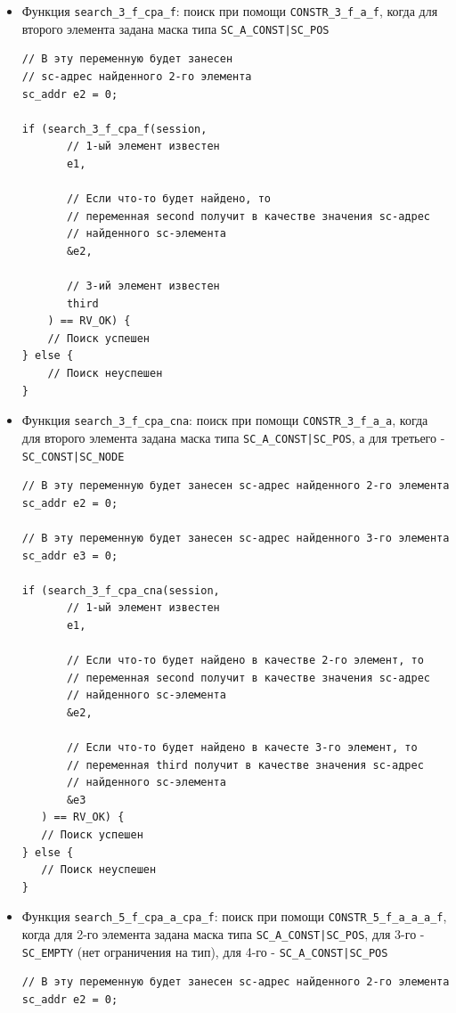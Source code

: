 \begin{itemize}
\item Функция \lstinline|search_3_f_cpa_f|: поиск при помощи
  \lstinline|CONSTR_3_f_a_f|, когда для второго элемента задана маска
  типа \lstinline+SC_A_CONST|SC_POS+
\begin{lstlisting}[texcl]
// В эту переменную будет занесен
// sc-адрес найденного 2-го элемента
sc_addr e2 = 0;

if (search_3_f_cpa_f(session,
       // 1-ый элемент известен
       e1,

       // Если что-то будет найдено, то
       // переменная second получит в качестве значения sc-адрес
       // найденного sc-элемента
       &e2,

       // 3-ий элемент известен
       third
    ) == RV_OK) {
    // Поиск успешен
} else {
    // Поиск неуспешен
}
\end{lstlisting}

\item Функция \lstinline|search_3_f_cpa_cna|: поиск при помощи
  \lstinline|CONSTR_3_f_a_a|, когда для второго элемента задана маска
  типа \lstinline+SC_A_CONST|SC_POS+, а для третьего -
  \lstinline+SC_CONST|SC_NODE+
\begin{lstlisting}[texcl]
// В эту переменную будет занесен sc-адрес найденного 2-го элемента
sc_addr e2 = 0;

// В эту переменную будет занесен sc-адрес найденного 3-го элемента
sc_addr e3 = 0;

if (search_3_f_cpa_cna(session,
       // 1-ый элемент известен
       e1,

       // Если что-то будет найдено в качестве 2-го элемент, то
       // переменная second получит в качестве значения sc-адрес
       // найденного sc-элемента
       &e2,

       // Если что-то будет найдено в качесте 3-го элемент, то
       // переменная third получит в качестве значения sc-адрес
       // найденного sc-элемента
       &e3
   ) == RV_OK) {
   // Поиск успешен
} else {
   // Поиск неуспешен
}
\end{lstlisting}

\item Функция \lstinline|search_5_f_cpa_a_cpa_f|: поиск при помощи
  \lstinline|CONSTR_5_f_a_a_a_f|, когда для 2-го элемента задана маска
  типа \lstinline+SC_A_CONST|SC_POS+, для 3-го - \lstinline|SC_EMPTY|
  (нет ограничения на тип), для 4-го - \lstinline+SC_A_CONST|SC_POS+

\begin{lstlisting}[texcl]
// В эту переменную будет занесен sc-адрес найденного 2-го элемента
sc_addr e2 = 0;


\end{lstlisting}
\end{itemize}

